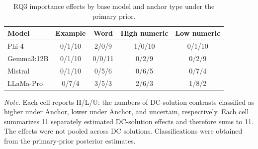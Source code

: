 \begin{table}[tbp]
\caption{RQ3 importance effects by base model and anchor type under the primary prior.}
\label{tab:rq3_importance_primary_compact}
\begin{tabular}{lcccc}
\toprule
Model & Example & Word & High numeric & Low numeric \\
\midrule
Phi-4 & 0/1/10 & 2/0/9 & 1/0/10 & 0/1/10 \\
Gemma3:12B & 0/1/10 & 0/0/11 & 0/2/9 & 0/2/9 \\
Mistral & 0/1/10 & 0/5/6 & 0/6/5 & 0/7/4 \\
LLaMa-Pro & 0/7/4 & 3/5/3 & 2/6/3 & 1/8/2 \\
\bottomrule
\end{tabular}
\vspace{2pt}
\begin{minipage}{\linewidth}
\footnotesize\textit{Note.} Each cell reports H/L/U: the numbers of DC-solution contrasts classified as higher under Anchor, lower under Anchor, and uncertain, respectively. Each cell summarizes 11 separately estimated DC-solution effects and therefore sums to 11. The effects were not pooled across DC solutions. Classifications were obtained from the primary-prior posterior estimates.
\end{minipage}
\end{table}

